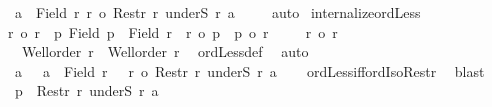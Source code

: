 \begin{isabellebody}
\ {\isachardoublequoteopen}{\isasymexists}a\ {\isasymin}\ Field\ r{\isachardot}{\kern0pt}\ r{\isacharprime}{\kern0pt}\ {\isacharequal}{\kern0pt}o\ Restr\ r\ {\isacharparenleft}{\kern0pt}underS\ r\ a{\isacharparenright}{\kern0pt}{\isachardoublequoteclose}\ \isamarkupfalse%
\ {}\ \isamarkupfalse%
\ auto\isanewline
{}\isamarkupfalse%
%
\endisatagproof
{\isafoldproof}%
%
\isadelimproof
\isanewline
%
\endisadelimproof
\isanewline
{}\isamarkupfalse%
\ internalize{\isacharunderscore}{\kern0pt}ordLess{\isacharcolon}{\kern0pt}\isanewline
{\isachardoublequoteopen}{\isacharparenleft}{\kern0pt}r{\isacharprime}{\kern0pt}\ {\isacharless}{\kern0pt}o\ r{\isacharparenright}{\kern0pt}\ {\isacharequal}{\kern0pt}\ {\isacharparenleft}{\kern0pt}{\isasymexists}p{\isachardot}{\kern0pt}\ Field\ p\ {\isacharless}{\kern0pt}\ Field\ r\ {\isasymand}\ r{\isacharprime}{\kern0pt}\ {\isacharequal}{\kern0pt}o\ p\ {\isasymand}\ p\ {\isacharless}{\kern0pt}o\ r{\isacharparenright}{\kern0pt}{\isachardoublequoteclose}\isanewline
%
\isadelimproof
%
\endisadelimproof
%
\isatagproof
{}\isamarkupfalse%
\isanewline
\ \ \isamarkupfalse%
\ {\isacharasterisk}{\kern0pt}{\isacharcolon}{\kern0pt}\ {\isachardoublequoteopen}r{\isacharprime}{\kern0pt}\ {\isacharless}{\kern0pt}o\ r{\isachardoublequoteclose}\isanewline
\ \ \isamarkupfalse%
\ {}{\isacharcolon}{\kern0pt}\ {\isachardoublequoteopen}Well{\isacharunderscore}{\kern0pt}order\ r\ {\isasymand}\ Well{\isacharunderscore}{\kern0pt}order\ r{\isacharprime}{\kern0pt}{\isachardoublequoteclose}\ \isamarkupfalse%
\ ordLess{\isacharunderscore}{\kern0pt}def\ \isamarkupfalse%
\ auto\isanewline
\ \ \isamarkupfalse%
\ {\isacharasterisk}{\kern0pt}\ \isamarkupfalse%
\ a\ \ {}{\isacharcolon}{\kern0pt}\ {\isachardoublequoteopen}a\ {\isasymin}\ Field\ r{\isachardoublequoteclose}\ \ {}{\isacharcolon}{\kern0pt}\ {\isachardoublequoteopen}r{\isacharprime}{\kern0pt}\ {\isacharequal}{\kern0pt}o\ Restr\ r\ {\isacharparenleft}{\kern0pt}underS\ r\ a{\isacharparenright}{\kern0pt}{\isachardoublequoteclose}\isanewline
\ \ \isamarkupfalse%
\ ordLess{\isacharunderscore}{\kern0pt}iff{\isacharunderscore}{\kern0pt}ordIso{\isacharunderscore}{\kern0pt}Restr\ \isamarkupfalse%
\ blast\isanewline
\ \ \isamarkupfalse%
\ {\isacharquery}{\kern0pt}p\ {\isacharequal}{\kern0pt}\ {\isachardoublequoteopen}Restr\ r\ {\isacharparenleft}{\kern0pt}underS\ r\ a{\isacharparenright}{\kern0pt}{\isachardoublequoteclose}\isanewline

\end{isabellebody}

